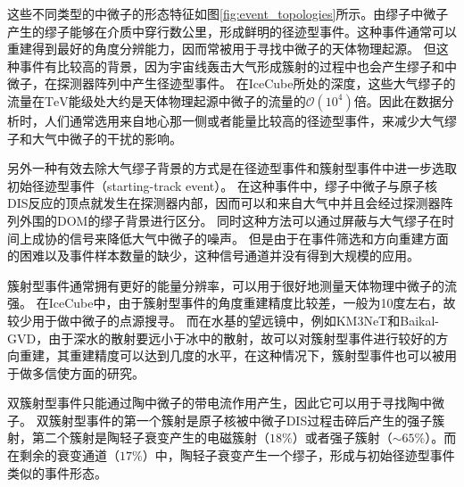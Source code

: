 这些不同类型的中微子的形态特征如图\ref{fig:event_topologies}所示。由缪子中微子产生的缪子能够在介质中穿行数公里，形成鲜明的径迹型事件。这种事件通常可以重建得到最好的角度分辨能力\cite{AMANDA_track_reco:2003, IceCube_track_reco:2021, KM3NeT_reco:2017, Baikal_track_reco:2021}，因而常被用于寻找中微子的天体物理起源\cite{IceCube_10yr_point_source:2019, KM3NeT_sensitivity:2018, ANTARES_IceCube_point_source:2020}。
但这种事件有比较高的背景，因为宇宙线轰击大气形成簇射的过程中也会产生缪子和中微子，在探测器阵列中产生径迹型事件。
在IceCube所处的深度，这些大气缪子的流量在$\mathrm{TeV}$能级处大约是天体物理起源中微子的流量的$\mathcal{O}(10^4)$倍\cite{IceCube_atmos_muon_flux:2018}。因此在数据分析时，人们通常选用来自地心那一侧或者能量比较高的径迹型事件，来减少大气缪子和大气中微子的干扰的影响。

另外一种有效去除大气缪子背景的方式是在径迹型事件和簇射型事件中进一步选取初始径迹型事件（starting-track event）\cite{IceCube_starting_track:2021}。
在这种事件中，缪子中微子与原子核DIS反应的顶点就发生在探测器内部，因而可以和来自大气中并且会经过探测器阵列外围的DOM的缪子背景进行区分。
同时这种方法可以通过屏蔽与大气缪子在时间上成协的信号来降低大气中微子的噪声\cite{IceCube_atmos_neutrino_flux:2016}。
但是由于在事件筛选和方向重建方面的困难以及事件样本数量的缺少，这种信号通道并没有得到大规模的应用\cite{IceCube_starting_track:2021b}。

簇射型事件通常拥有更好的能量分辨率\cite{IceCube_energy_reco:2013, KM3NeT_reco:2017, Baikal_cascade_reco:2022}，可以用于很好地测量天体物理中微子的流强\cite{IceCube_6yr_cascade_spectrum:2020}。
在IceCube中，由于簇射型事件的角度重建精度比较差\cite{IceCube_cascade_dir_reco:2019, IceCube_cascade_dir_reco:2021}，一般为10度左右，故较少用于做中微子的点源搜寻\cite{IceCube_cascade_source_search:2016}。
而在水基的望远镜中，例如KM3NeT和Baikal-GVD，由于深水的散射要远小于冰中的散射\cite{OP_ANTARES:2004, OP_Baikal:2012, OP_Grace:2018, OP_IceCube:2006, OP_NEMO:2006, OP_P-One:2021}，故可以对簇射型事件进行较好的方向重建，其重建精度可以达到几度的水平\cite{KM3NeT_reco:2017, Baikal_cascade_reco:2022}，在这种情况下，簇射型事件也可以被用于做多信使方面的研究\cite{Baikal_cascade_events:2019, Baikal_TXS:2022}。

双簇射型事件只能通过陶中微子的带电流作用产生，因此它可以用于寻找陶中微子\cite{IceCube_tau_Donglian:2015, IceCube_tau_Logan:2019, IceCube_tau:2020, Baikal_double_cascade_tau:2023, KM3NeT_double_cascade_tau:2021}。
双簇射型事件的第一个簇射是原子核被中微子DIS过程击碎后产生的强子簇射，第二个簇射是陶轻子衰变产生的电磁簇射（$18\%$）或者强子簇射（$\sim 65\%$）。而在剩余的衰变通道（$17\%$）中，陶轻子衰变产生一个缪子，形成与初始径迹型事件类似的事件形态。

